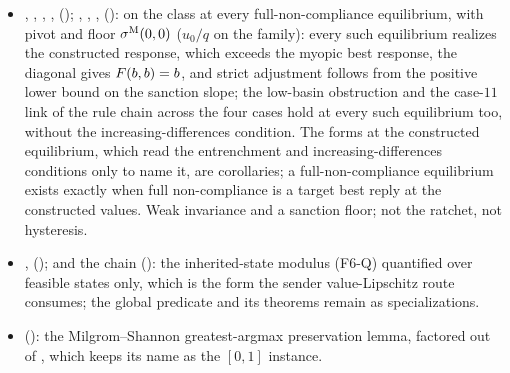 \begin{itemize}[leftmargin=1.4em,itemsep=1pt]
\item {}, , , ,  (); , , ,  ():  on the class at every full-non-compliance equilibrium, with pivot and floor $\sigma^{\mathrm{M}}(0,0)$ ($u_0/q$ on the family): every such equilibrium realizes the constructed response, which exceeds the myopic best response, the diagonal gives $F(b,b)=b$, and strict adjustment follows from the positive lower bound on the sanction slope; the low-basin obstruction and the case-$11$ link of the rule chain across the four cases hold at every such equilibrium too, without the increasing-differences condition. The forms at the constructed equilibrium, which read the entrenchment and increasing-differences conditions only to name it, are corollaries; a full-non-compliance equilibrium exists exactly when full non-compliance is a target best reply at the constructed values. Weak invariance and a sanction floor; not the ratchet, not hysteresis.
\item {},  ();  and the  chain (): the inherited-state modulus (F6-Q) quantified over feasible states only, which is the form the sender value-Lipschitz route consumes; the global predicate and its theorems remain as specializations.
\item {} (): the Milgrom--Shannon greatest-argmax preservation lemma, factored out of , which keeps its name as the $[0,1]$ instance.

\end{itemize}
